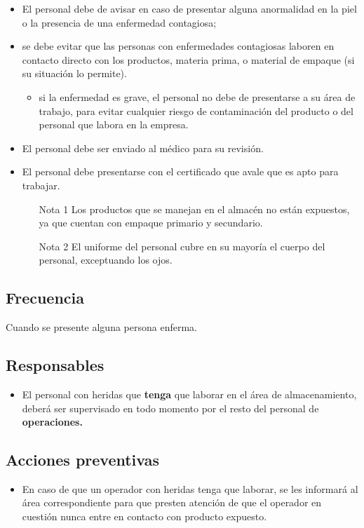 \begin{itemize}
	\item El personal debe de avisar en caso de presentar alguna anormalidad en la piel o la presencia de una enfermedad contagiosa;
	\item se debe evitar que las personas con enfermedades contagiosas laboren en contacto directo con los productos, materia prima, o material de empaque (si su situación lo permite).
	\begin{itemize}
		\item si la enfermedad es grave, el personal no debe de presentarse a su área de trabajo, para evitar cualquier riesgo de contaminación del producto o del personal que labora en la empresa.
	\end{itemize}
	\item El personal debe ser enviado al médico para su revisión.
	\item El personal debe presentarse con el certificado que avale que es apto para trabajar.
	\begin{itemize}
		\item[Nota 1] Los productos que se manejan en el almacén no están expuestos, ya que cuentan con empaque primario y secundario.
		\item[Nota 2] El uniforme del personal cubre en su mayoría el cuerpo del personal, exceptuando los ojos.
	\end{itemize}
\end{itemize}

\subsection{Frecuencia}
Cuando se presente alguna persona enferma.

\subsection{Responsables}
\begin{itemize}
	\item El personal con heridas que \textbf{tenga} que laborar en el área de almacenamiento, deberá ser supervisado en todo momento por el resto del personal de \textbf{operaciones.}
\end{itemize}

\subsection{Acciones preventivas}
\begin{itemize}
	\item En caso de que un operador con heridas tenga que laborar, se les informará al área correspondiente para que presten atención de que el operador en cuestión nunca entre en contacto con producto expuesto.
\end{itemize}

